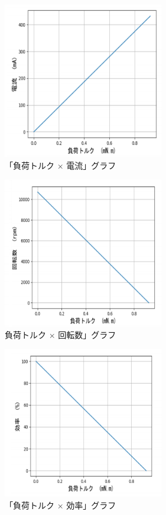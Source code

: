 \begin{figure}[t]
	\centering
	\includegraphics[width=7cm]{./Image/current.png}
	\caption{「負荷トルク $\times$ 電流」グラフ}
	\label{fig:current}
\end{figure}
\begin{figure}[t]
	\centering
	\includegraphics[width=7cm]{./Image/speed.png}
	\caption{負荷トルク $\times$ 回転数」グラフ}
	\label{fig:speed}
\end{figure}
\begin{figure}[t]
	\centering
	\includegraphics[width=7cm]{./Image/efficiency.png}
	\caption{「負荷トルク $\times$ 効率」グラフ}
	\label{fig:effi}
\end{figure}
